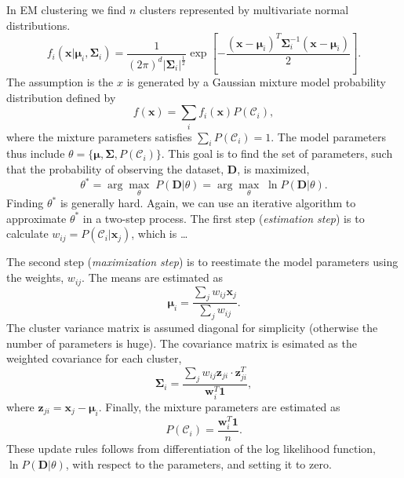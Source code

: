 \documentclass[oneside]{memoir}
\renewcommand{\vec}[1]{\ensuremath{\bm{#1}}}
\begin{document}
In EM clustering we find $n$ clusters represented by multivariate normal distributions.
\begin{equation}
  \label{EM clustering f}
  f_i(\vec{x}|\vec{\mu}_i,\vec{\Sigma}_i) = \frac{1}{(2\pi)^d |\vec{\Sigma}_i|^{\frac{1}{2}}}  \exp \left[ - \frac{(\vec{x}-\vec{\mu}_i)^T\vec{\Sigma}_i^{-1}(\vec{x}-\vec{\mu}_i)}{2} \right]. 
\end{equation}
The assumption is the $x$ is generated by a Gaussian mixture model probability distribution defined by
\begin{equation}
  \label{gaussian mixture model}
f(\vec{x}) = \sum_i f_i(\vec{x}) P(\mathcal{C}_i),
\end{equation}
where the mixture parameters satisfies $\sum_i P(\mathcal{C}_i) = 1$. The model parameters thus include $\theta = \{ \vec{\mu},\vec{\Sigma},P(\mathcal{C}_i)\}$. This goal is to find the set of parameters, such that the probability of observing the dataset, $\vec{D}$, is maximized,
\begin{equation}
  \label{theta max}
  \theta^* = \arg \max_{\theta} \; P(\vec{D}|\theta) =  \arg \max_{\theta} \; \ln P(\vec{D}|\theta).
\end{equation}
Finding $\theta^*$ is generally hard. Again, we can use an iterative algorithm to approximate $\theta^*$ in a two-step process. The first step (\emph{estimation step}) is to calculate $w_{ij} = P(\mathcal{C}_i|\vec{x}_j)$, which is \dots

The second step (\emph{maximization step}) is to reestimate the model parameters using the weights, $w_{ij}$. The means are estimated as
\begin{equation}
  \label{EM means}
  \vec{\mu}_i = \frac{\sum_j w_{ij} \vec{x}_j}{\sum_j w_{ij}}.
\end{equation}
The cluster variance matrix is assumed diagonal for simplicity (otherwise the number of parameters is huge). The covariance matrix is esimated as the weighted covariance for each cluster,
\begin{equation}
  \label{covariance estimate}
  \vec{\Sigma}_i = \frac{\sum_j w_{ij} \vec{z}_{ji}\cdot \vec{z}^T_{ji}}{\vec{w}_i^T\bm{1}},
\end{equation}
where $\vec{z}_{ji} = \vec{x}_j - \vec{\mu}_i$. Finally, the mixture parameters are estimated as
\begin{equation}
  \label{mixture parameter estimation}
  P(\mathcal{C}_i) = \frac{\vec{w}_i^T \vec{1}}{n}.
\end{equation}
These update rules follows from differentiation of the log likelihood function, $\ln P(\vec{D}|\theta)$, with respect to the parameters, and setting it to zero. 
\end{document}
